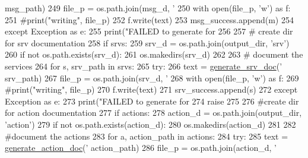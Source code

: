 \begin{DoxyCode}
{      msg\_path)
249             file\_p = os.path.join(msg\_d, \textcolor{stringliteral}{'%
250             with open(file\_p, \textcolor{stringliteral}{'w'}) \textcolor{keyword}{as} f:
251                 \textcolor{comment}{#print("writing", file\_p)}
252                 f.write(text)
253             msg\_success.append(m)
254         \textcolor{keywordflow}{except} Exception \textcolor{keyword}{as} e:
255             print(\textcolor{stringliteral}{"FAILED to generate for %
256 
257     \textcolor{comment}{# create dir for srv documentation}
258     \textcolor{keywordflow}{if} srvs:
259         srv\_d = os.path.join(output\_dir, \textcolor{stringliteral}{'srv'})
260         \textcolor{keywordflow}{if} \textcolor{keywordflow}{not} os.path.exists(srv\_d):
261             os.makedirs(srv\_d)
262 
263     \textcolor{comment}{# document the services}
264     \textcolor{keywordflow}{for} s, srv\_path \textcolor{keywordflow}{in} srvs:
265         \textcolor{keywordflow}{try}:
266             text = \hyperlink{namespacerosdoc__lite_1_1msgenator_a06365fda5c3fb07b4e07c46bb24a5077}{generate\_srv\_doc}(\textcolor{stringliteral}{'%
      srv\_path)
267             file\_p = os.path.join(srv\_d, \textcolor{stringliteral}{'%
268             with open(file\_p, \textcolor{stringliteral}{'w'}) \textcolor{keyword}{as} f:
269                 \textcolor{comment}{#print("writing", file\_p)}
270                 f.write(text)
271             srv\_success.append(s)
272         \textcolor{keywordflow}{except} Exception \textcolor{keyword}{as} e:
273             print(\textcolor{stringliteral}{"FAILED to generate for %
274             \textcolor{keywordflow}{raise}
275 
276     \textcolor{comment}{#create dir for action documentation}
277     \textcolor{keywordflow}{if} actions:
278         action\_d = os.path.join(output\_dir, \textcolor{stringliteral}{'action'})
279         \textcolor{keywordflow}{if} \textcolor{keywordflow}{not} os.path.exists(action\_d):
280             os.makedirs(action\_d)
281 
282     \textcolor{comment}{#document the actions}
283     \textcolor{keywordflow}{for} a, action\_path \textcolor{keywordflow}{in} actions:
284         \textcolor{keywordflow}{try}:
285             text = \hyperlink{namespacerosdoc__lite_1_1msgenator_af6701c159861799487da66dc92db3540}{generate\_action\_doc}(\textcolor{stringliteral}{'%
      action\_path)
286             file\_p = os.path.join(action\_d, \textcolor{stringliteral}{'%
}}}}}}}}
\end{DoxyCode}
